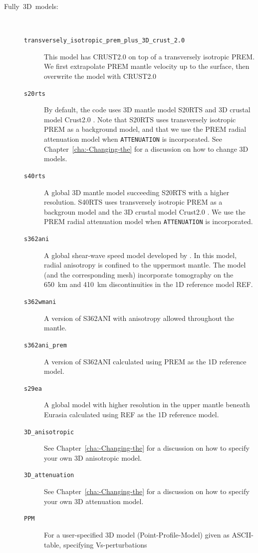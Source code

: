 \begin{description}
\item [{\textmd{Fully~3D~models:}}]~
\begin{description}
\item [{\texttt{transversely\_isotropic\_prem\_plus\_3D\_crust\_2.0}}] This
model has CRUST2.0 \citep{BaLaMa00} on top of a transversely isotropic
PREM. We first extrapolate PREM mantle velocity up to the surface,
then overwrite the model with CRUST2.0
%
\item [{\texttt{s20rts}}] By default, the code uses 3D mantle model S20RTS
\citep{RiVaWo99} and 3D crustal model Crust2.0 \citep{BaLaMa00}.
Note that S20RTS uses transversely isotropic PREM as a background
model, and that we use the PREM radial attenuation model when \texttt{ATTENUATION}
is incorporated. See Chapter~\ref{cha:-Changing-the} for a discussion
on how to change 3D models.
%
\item [{\texttt{s40rts}}] A global 3D mantle model \citep{RiDeVaWo11} succeeding S20RTS
with a higher resolution.
S40RTS uses transversely isotropic PREM as a backgroun
model and the 3D crustal model Crust2.0 \citep{BaLaMa00}.
We use the PREM radial attenuation model when \texttt{ATTENUATION}
is incorporated.
%
\item [{\texttt{s362ani}}] A global shear-wave speed
model developed by \citet{KuDzEk06}. In this model, radial anisotropy
is confined to the uppermost mantle. The model (and the corresponding
mesh) incorporate tomography on the 650~km and 410~km
discontinuities in the 1D reference model REF.
%
\item [{\texttt{s362wmani}}] A version of S362ANI with
anisotropy allowed throughout the mantle.
%
\item [{\texttt{s362ani\_prem}}] A version of S362ANI
calculated using PREM as the 1D reference model.
%
\item [{\texttt{s29ea}}] A global model with higher
resolution in the upper mantle beneath Eurasia calculated using REF
as the 1D reference model.
%
\item [{\texttt{3D\_anisotropic}}] See Chapter~\ref{cha:-Changing-the}
for a discussion on how to specify your own 3D anisotropic model.
%
\item [{\texttt{3D\_attenuation}}] See Chapter~\ref{cha:-Changing-the}
for a discussion on how to specify your own 3D attenuation model.
%
\item [{\texttt{PPM}}] For a user-specified 3D model (Point-Profile-Model)
given as ASCII-table, specifying Vs-perturbations

\end{description}
\end{description}
